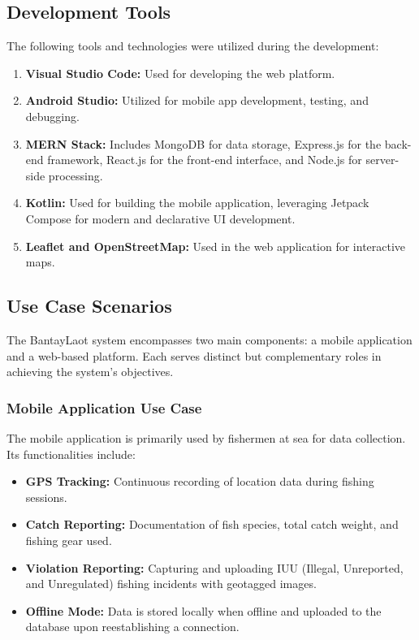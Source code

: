 \documentclass[journal]{IEEEtran}
\begin{document}
\subsection{Development Tools}
The following tools and technologies were utilized during the development:
\begin{enumerate}
    \item \textbf{Visual Studio Code:} Used for developing the web platform.
    \item \textbf{Android Studio:} Utilized for mobile app development, testing, and debugging.
    \item \textbf{MERN Stack:} Includes MongoDB for data storage, Express.js for the back-end framework, React.js for the front-end interface, and Node.js for server-side processing.
    \item \textbf{Kotlin:} Used for building the mobile application, leveraging Jetpack Compose for modern and declarative UI development.
    \item \textbf{Leaflet and OpenStreetMap:} Used in the web application for interactive maps.
\end{enumerate}

\subsection{Use Case Scenarios}
The BantayLaot system encompasses two main components: a mobile application and a web-based platform. Each serves distinct but complementary roles in achieving the system's objectives.

\subsubsection{Mobile Application Use Case}
The mobile application is primarily used by fishermen at sea for data collection. Its functionalities include:
\begin{itemize}
    \item \textbf{GPS Tracking:} Continuous recording of location data during fishing sessions.
    \item \textbf{Catch Reporting:} Documentation of fish species, total catch weight, and fishing gear used.
    \item \textbf{Violation Reporting:} Capturing and uploading IUU (Illegal, Unreported, and Unregulated) fishing incidents with geotagged images.
    \item \textbf{Offline Mode:} Data is stored locally when offline and uploaded to the database upon reestablishing a connection.
\end{itemize}
\end{document}
